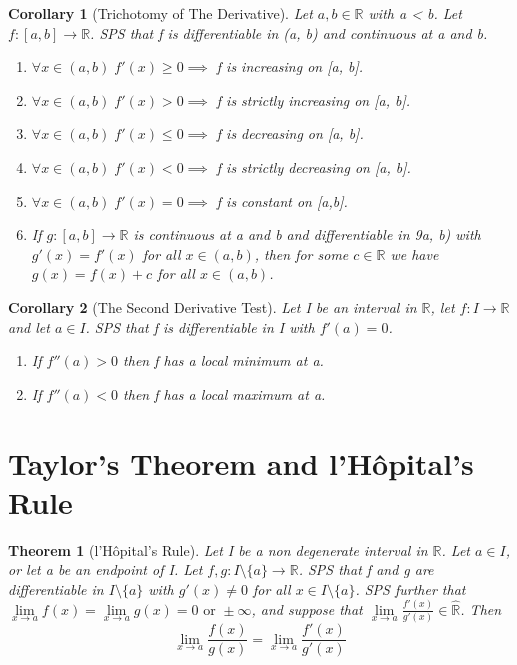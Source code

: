 \documentclass[11pt, oneside]{book}
\theoremstyle{break}
\newtheorem{thm}{Theorem}[section]
\newtheorem{crly}{Corollary}[thm]
\newcommand{\bb}[1]{\mathbb{#1}}		%
\begin{document}
\begin{crly}[Trichotomy of The Derivative]
	Let $a, b \in \bb{R}$ with a < b. Let $f: [a, b] \to \bb{R}$. SPS that f is differentiable in (a, b) and continuous at a and b.
	\begin{enumerate}
		\item $\forall x \in (a, b) \; f'(x) \geq 0 \implies $ f is increasing on [a, b].
		\item $\forall x \in (a, b) \; f'(x) > 0 \implies $ f is strictly increasing on [a, b].
		\item $\forall x \in (a, b) \; f'(x) \leq 0 \implies $ f is decreasing on [a, b].
		\item $\forall x \in (a, b) \; f'(x) < 0 \implies $ f is strictly decreasing on [a, b].
		\item $\forall x \in (a, b) \; f'(x) = 0 \implies $ f is constant on [a,b].
		\item If $g: [a ,b] \to \bb{R}$ is continuous at a and b and differentiable in 9a, b) with $g'(x) = f'(x)$ for all $x \in (a, b)$, then for some $c \in \bb{R}$ we have $g(x) = f(x) + c$ for all $x \in (a, b)$.
	\end{enumerate}
\end{crly}

\begin{crly}[The Second Derivative Test]
	Let I be an interval in $\bb{R}$, let $f: I \to \bb{R}$ and let $a \in I$. SPS that f is differentiable in I with $f'(a) = 0$.
	\begin{enumerate}
		\item If $f''(a) > 0$ then f has a local minimum at a.
		\item If $f''(a) < 0$ then f has a local maximum at a.
	\end{enumerate}
\end{crly}


\section{Taylor's Theorem and l'Hôpital's Rule}

\begin{thm}[l'Hôpital's Rule]
	Let I be a non degenerate interval in $\bb{R}$. Let $a \in I$, or let a be an endpoint of I. Let $f, g: I \setminus \{a\} \to \bb{R}$. SPS that f and g are differentiable in $I \setminus \{a\}$ with $g'(x) \neq 0$ for all $x \in I \setminus \{a\}$. SPS further that $\lim\limits_{x \to a} f(x) = \lim\limits_{x \to a} g(x) = 0 \text{ or } \pm \infty$, and suppose that $\lim\limits_{x \to a} \frac{f'(x)}{g'(x)} \in \hat{\bb{R}}$. Then
	\[
		\lim_{x \to a} \frac{f(x)}{g(x)} = \lim_{x \to a} \frac{f'(x)}{g'(x)}
	\]
\end{thm}
\end{document}
